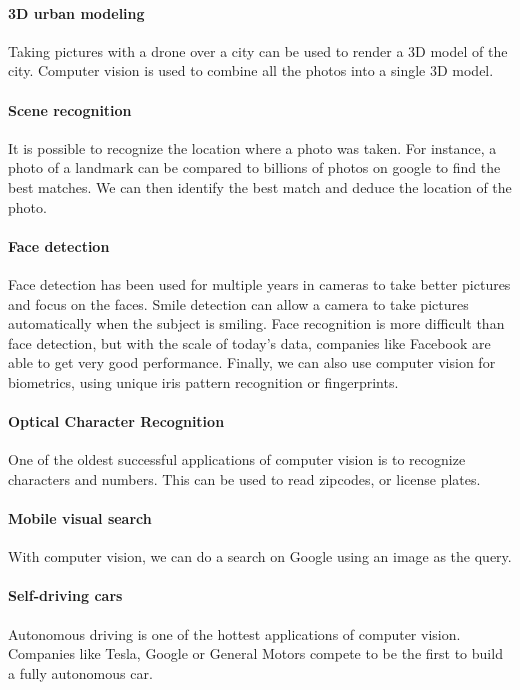 \documentclass{article}
\begin{document}
\paragraph{3D urban modeling}
Taking pictures with a drone over a city can be used to render a 3D model of the city. Computer vision is used to combine all the photos into a single 3D model.

\paragraph{Scene recognition}
It is possible to recognize the location where a photo was taken. For instance, a photo of a landmark can be compared to billions of photos on google to find the best matches. We can then identify the best match and deduce the location of the photo.

\paragraph{Face detection}
Face detection has been used for multiple years in cameras to take better pictures and focus on the faces. Smile detection can allow a camera to take pictures automatically when the subject is smiling. Face recognition is more difficult than face detection, but with the scale of today's data, companies like Facebook are able to get very good performance. Finally, we can also use computer vision for biometrics, using unique iris pattern recognition or fingerprints.

\paragraph{Optical Character Recognition}
One of the oldest successful applications of computer vision is to recognize characters and numbers. This can be used to read zipcodes, or license plates.

\paragraph{Mobile visual search}
With computer vision, we can do a search on Google using an image as the query.

\paragraph{Self-driving cars}
Autonomous driving is one of the hottest applications of computer vision. Companies like Tesla, Google or General Motors compete to be the first to build a fully autonomous car.
\end{document}
